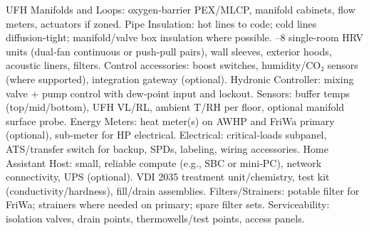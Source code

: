 {}\markdownRendererUlBeginTight
\markdownRendererUlItem UFH Manifolds and Loops: oxygen‑barrier PEX/MLCP, manifold cabinets, flow meters, actuators if zoned.\markdownRendererUlItemEnd 
\markdownRendererUlItem Pipe Insulation: hot lines to code; cold lines diffusion‑tight; manifold/valve box insulation where possible.\markdownRendererUlItemEnd 
\markdownRendererUlEndTight \markdownRendererInterblockSeparator
{}
\markdownRendererSectionEnd \markdownRendererSectionBegin
{}\markdownRendererInterblockSeparator
{}\markdownRendererUlBeginTight
{}–8 single‑room HRV units (dual‑fan continuous or push‑pull pairs), wall sleeves, exterior hoods, acoustic liners, filters.\markdownRendererUlItemEnd 
\markdownRendererUlItem Control accessories: boost switches, humidity/CO₂ sensors (where supported), integration gateway (optional).\markdownRendererUlItemEnd 
\markdownRendererUlEndTight \markdownRendererInterblockSeparator
{}
\markdownRendererSectionEnd \markdownRendererSectionBegin
{}\markdownRendererInterblockSeparator
{}\markdownRendererUlBeginTight
\markdownRendererUlItem Hydronic Controller: mixing valve + pump control with dew‑point input and lockout.\markdownRendererUlItemEnd 
\markdownRendererUlItem Sensors: buffer temps (top/mid/bottom), UFH VL/RL, ambient T/RH per floor, optional manifold surface probe.\markdownRendererUlItemEnd 
\markdownRendererUlItem Energy Meters: heat meter(s) on AWHP and FriWa primary (optional), sub‑meter for HP electrical.\markdownRendererUlItemEnd 
\markdownRendererUlItem Electrical: critical‑loads subpanel, ATS/transfer switch for backup, SPDs, labeling, wiring accessories.\markdownRendererUlItemEnd 
\markdownRendererUlItem Home Assistant Host: small, reliable compute (e.g., SBC or mini‑PC), network connectivity, UPS (optional).\markdownRendererUlItemEnd 
\markdownRendererUlEndTight \markdownRendererInterblockSeparator
{}
\markdownRendererSectionEnd \markdownRendererSectionBegin
{}\markdownRendererInterblockSeparator
{}\markdownRendererUlBeginTight
\markdownRendererUlItem VDI 2035 treatment unit/chemistry, test kit (conductivity/hardness), fill/drain assemblies.\markdownRendererUlItemEnd 
\markdownRendererUlItem Filters/Strainers: potable filter for FriWa; strainers where needed on primary; spare filter sets.\markdownRendererUlItemEnd 
\markdownRendererUlItem Serviceability: isolation valves, drain points, thermowells/test points, access panels.\markdownRendererUlItemEnd 
\markdownRendererUlEndTight 
\markdownRendererSectionEnd 
\markdownRendererSectionEnd \markdownRendererDocumentEnd